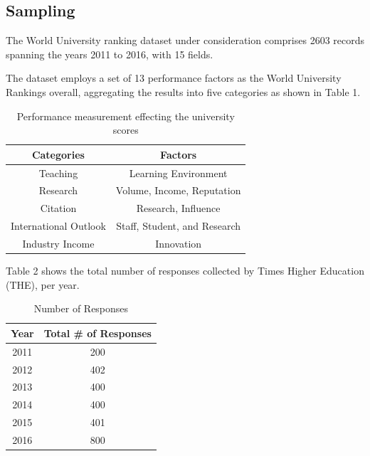 \documentclass[a4paper]{article}
\begin{document}
\subsection* {Sampling}
The World University ranking dataset under consideration comprises 2603 records spanning the years 2011 to 2016, with 15 fields. 

The dataset employs a set of 13 performance factors as the World University Rankings overall, aggregating the results into five categories as shown in Table 1.

\begin{table}[h]
    \centering
    \caption{Performance measurement effecting the university scores}
    \begin{tabular}{|c|c|}
        \hline
        \textbf{Categories} & \textbf{Factors} \\
        \hline
        Teaching & Learning Environment \\
        \hline
        Research & Volume, Income, Reputation \\
        \hline
        Citation & Research, Influence \\
        \hline
        International Outlook & Staff, Student, and Research \\
        \hline
        Industry Income & Innovation \\
        \hline
    \end{tabular}
\end{table}

Table 2 shows the total number of responses collected by Times Higher Education (THE), per year.

\begin{table}[h]
    \centering
    \caption{Number of Responses}
    \begin{tabular}{|c|c|}
        \hline
        \textbf{Year} & \textbf{Total \# of Responses} \\
        \hline
        2011 & 200 \\
        \hline
        2012 & 402 \\
        \hline
        2013 & 400 \\
        \hline
        2014 & 400 \\
        \hline
        2015 & 401 \\
        \hline
        2016 & 800 \\
        \hline
    \end{tabular}
\end{table}
\end{document}
